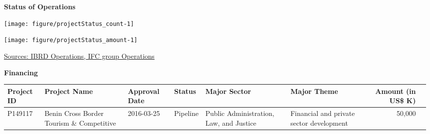 \documentclass{article}\usepackage[]{graphicx}\usepackage[]{color}
\begin{document}
\begin{minipage}[b]{0.99\textwidth} %
\vspace*{0.5cm}
\raggedright{\color{white!30!blue} \textbf{\large Status of Operations}}
     \vspace*{0.5cm}
     
  \begin{minipage}[t]{0.99\textwidth}
    \begin{minipage}[c]{0.49\textwidth}
      \vspace*{0.2cm}
      \vspace*{0.3cm}


{\centering \texttt{[image: figure/projectStatus\_count-1]} 

}



      \end{minipage}
      \begin{minipage}[c]{0.49\textwidth}


{\centering \texttt{[image: figure/projectStatus\_amount-1]} 

}



      \end{minipage}
 
\raggedright{\footnotesize{\href{http://www.worldbank.org/en/topic/macroeconomics/overview}{Sources: IBRD Operations, IFC group Operations}}}
   \end{minipage}
  
   \begin{minipage}[b]{0.99\textwidth} %
     \vspace*{1cm}
     \begin{minipage}[c]{0.99\textwidth}  
     \raggedright{\color{white!30!blue} \textbf{\large Financing}}
     \vspace*{0.5cm}
     
{\footnotesize
\begin{tabular}{l>{\raggedright}p{1in}ll>{\raggedright}p{1in}>{\raggedright}p{1in}rl}
 Project ID & Project Name & Approval Date & Status & Major Sector & Major Theme & Amount (in US\$ K) &  \\ 
  \hline
P149117 & Benin Cross Border Tourism \& Competitive & 2016-03-25 & Pipeline & Public Administration, Law, and Justice & Financial and private sector development & 50,000 &  \\ 
  \end{tabular}
}


\end{minipage}
\end{minipage}
\end{minipage}
\end{document}
